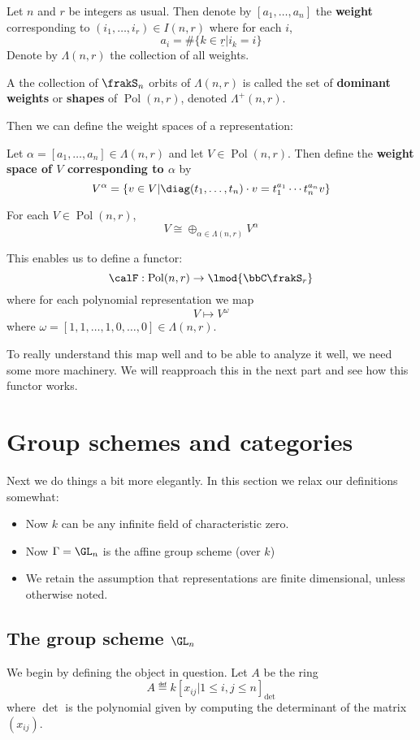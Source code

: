 \documentclass[12pt]{article}
\DeclareMathOperator{\Pol}{Pol}
\begin{document}
	\begin{defn}
		Let $n$ and $r$ be integers as usual. Then denote by $[a_1,\dots,a_n]$ the \textbf{weight} corresponding to 
		$(i_1,\dots,i_r)\in I(n,r)$ where for each $i$,
		\[a_i=\#\{k\in\underline r| i_k=i\}\]
		Denote by $\Lambda(n,r)$ the collection of all weights. 
	\end{defn}
	\begin{defn}
		A the collection of $\frakS_n$ orbits of $\Lambda(n,r)$ is called the set of \textbf{dominant weights} or \textbf{shapes}
		of $\Pol(n,r)$, denoted $\Lambda^+(n,r)$.
	\end{defn}
	Then we can define the weight spaces of a representation:
	\begin{defn}
		Let $\alpha=[a_1,\dots,a_n]\in\Lambda(n,r)$ and let $V\in\Pol(n,r)$. Then define the \textbf{weight space of $V$ corresponding to $\alpha$}
		by 
		\[V^\alpha=\{v\in V|\diag(t_1,\dots,t_n)\cdot v=t_1^{a_1}\cdots t_n^{a_n}v\}\]
	\end{defn}
	\begin{thm}
		For each $V\in\Pol(n,r)$,
		\[V\cong\oplus_{\alpha\in\Lambda(n,r)}V^\alpha\]
	\end{thm}
	This enables us to define a functor:
	\[\calF:\Pol(n,r)\to\lmod{\bbC\frakS_r}\]
	where for each polynomial representation we map 
	\[V\mapsto V^\omega\]
	where $\omega=[1,1,\dots,1,0,\dots,0]\in\Lambda(n,r)$.

	To really understand this map well and to be able to analyze it well, we need some more machinery.
	We will reapproach this in the next part and see how this functor works.

\section{Group schemes and categories}
	Next we do things a bit more elegantly. In this section we relax our definitions somewhat:
	\begin{itemize}
		\item Now $k$ can be any infinite field of characteristic zero.
		\item Now $\Gamma=\GL_n$ is the affine group scheme (over $k$)
		\item We retain the assumption that representations are finite dimensional, unless otherwise noted.
	\end{itemize}
	\subsection{The group scheme \texorpdfstring{$\GL_n$}{GLn}}
	We begin by defining the object in question. Let $A$ be the ring 
	\[A\eqdef k[x_{ij}|1\le i,j\le n]_{\det}\]
	where $\det$ is the polynomial given by computing the determinant of the matrix $(x_{ij})$.
\end{document}
